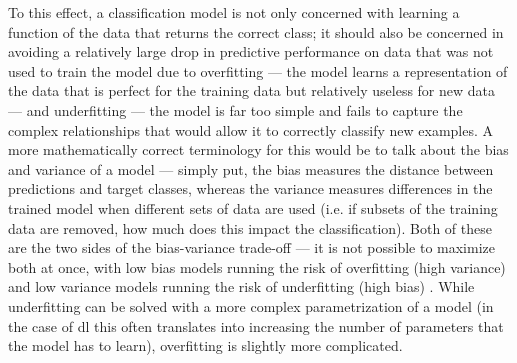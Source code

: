 To this effect, a classification model is not only concerned with learning a function of the data that returns the correct class; it should also be concerned in avoiding a relatively large drop in predictive performance on data that was not used to train the model due to overfitting --- the model learns a representation of the data that is perfect for the training data but relatively useless for new data --- and underfitting --- the model is far too simple and fails to capture the complex relationships that would allow it to correctly classify new examples. A more mathematically correct terminology for this would be to talk about the bias and variance of a model --- simply put, the bias measures the distance between predictions and target classes, whereas the variance measures differences in the trained model when different sets of data are used (i.e. if subsets of the training data are removed, how much does this impact the classification). Both of these are the two sides of the bias-variance trade-off --- it is not possible to maximize both at once, with low bias models running the risk of overfitting (high variance) and low variance models running the risk of underfitting (high bias) \cite{James2013-py}. While underfitting can be solved with a more complex parametrization of a model (in the case of \ac{dl} this often translates into increasing the number of parameters that the model has to learn), overfitting is slightly more complicated.

